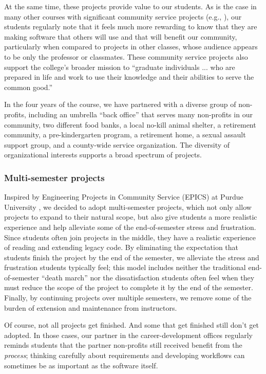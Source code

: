 At the same time, these projects provide value to our students.  As
is the case in many other courses with significant community service
projects (e.g., \cite{coyle-2005, hfoss-2018}), our students
regularly note that it feels much more rewarding to know that they are
making software that others will use and that will benefit our community,
particularly when compared to projects in other classes, whose audience
appears to be only the professor or classmates.
These community service projects also support
the college's broader mission to ``graduate individuals ... who are
prepared in life and work to use their knowledge and their abilities
to serve the common good.'' \cite{grinnell-mission}

In the four years of the course, we have partnered with a diverse
group of non-profits, including an umbrella ``back office'' that
serves many non-profits in our community, two different food banks,
a local no-kill animal shelter, a retirement community, a
pre-kindergarten program, a retirement home, a sexual assault support
group, and a county-wide service organization.  The diversity of
organizational interests supports a broad spectrum of projects.

\subsubsection{Multi-semester projects}

Inspired by Engineering Projects in Community Service (EPICS) at
Purdue University \cite{coyle-2005}, we decided to adopt multi-semester
projects, which not only allow projects to expand to their natural
scope, but also give students a more realistic experience and help
alleviate some of the end-of-semester stress and frustration.  Since
students often join projects in the middle, they have a realistic
experience of reading and extending legacy code.  By eliminating the
expectation that students finish the project by the end of the
semester, we alleviate the stress and frustration students typically
feel; this model includes neither the traditional end-of-semester
``death march'' nor the dissatisfaction students often feel when 
they must reduce the scope of the project to complete it by the
end of the semester.  Finally, by continuing projects over multiple
semesters, we remove some of the burden of extension and maintenance
from instructors.

Of course, not all projects get finished.  And some that get finished
still don't get adopted.  In those cases, our partner in the 
career-development offices regularly reminds students that the
partner non-profits still received benefit from the \textit{process};
thinking carefully about requirements and developing workflows can
sometimes be as important as the software itself.

